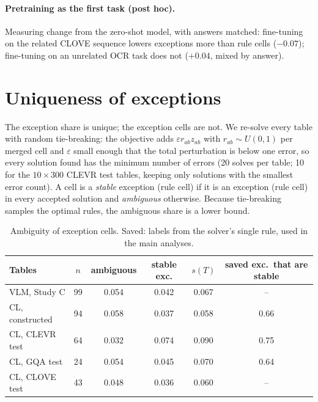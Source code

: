 \paragraph{Pretraining as the first task (post hoc).}
Measuring change from the zero-shot model, with answers matched: fine-tuning on the related
CLOVE sequence lowers exceptions more than rule cells ($-0.07$); fine-tuning on an unrelated
OCR task does not ($+0.04$, mixed by answer).


\section{Uniqueness of exceptions}
\label{sup:unique}

The exception share is unique; the exception cells are not. We re-solve every table with random tie-breaking: the
objective adds $\varepsilon r_{ab} z_{ab}$ with $r_{ab}\sim U(0,1)$ per merged cell and $\varepsilon$ small enough that
the total perturbation is below one error, so every solution found has the minimum number of errors (20 solves per
table; 10 for the $10\times300$ CLEVR test tables, keeping only solutions with the smallest error count). A cell is a
\emph{stable} exception (rule cell) if it is an exception (rule cell) in every accepted solution and \emph{ambiguous}
otherwise. Because tie-breaking samples the optimal rules, the ambiguous share is a lower bound.

\begin{table}[h]
\centering\small\setlength{\tabcolsep}{3pt}
\caption{Ambiguity of exception cells. Saved: labels from the solver's single rule, used in the main analyses.}
\label{tab:unique}
\begin{tabular}{lccccc}
\toprule
Tables & $n$ & ambiguous & stable exc. & $s(T)$ & saved exc.\ that are stable \\
\midrule
VLM, Study C        & 99 & 0.054 & 0.042 & 0.067 & -- \\
CL, constructed     & 94 & 0.058 & 0.037 & 0.058 & 0.66 \\
CL, CLEVR test      & 64 & 0.032 & 0.074 & 0.090 & 0.75 \\
CL, GQA test        & 24 & 0.054 & 0.045 & 0.070 & 0.64 \\
CL, CLOVE test      & 43 & 0.048 & 0.036 & 0.060 & -- \\
\bottomrule
\end{tabular}
\end{table}


